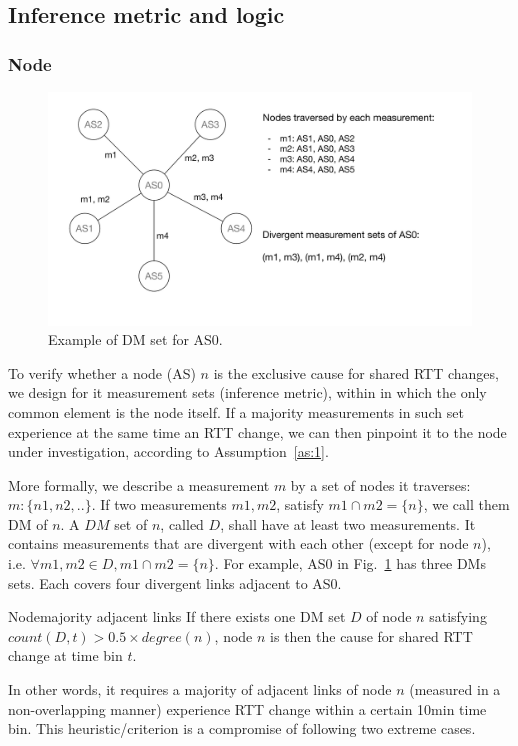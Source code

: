 \subsection{Inference metric and logic}
\subsubsection{Node}
\begin{figure}[!htb]
\centering
\includegraphics[width=1\textwidth]{gfx/chap5/dms.pdf}
\caption{Example of \acf{DM} set for AS0.}
\label{fig:chap5_dms}
\end{figure}

To verify whether a node (AS) $n$ is the exclusive cause for shared RTT changes, we
design for it measurement sets (inference metric), within in which the only common element is the node itself. If a majority measurements in such set experience at the same time an RTT change, we can then pinpoint it to the node under investigation, according to Assumption~\ref{as:1}.

More formally, we describe a measurement $m$ by a set of nodes it traverses: $m:\{n1, n2,..\}$. 
If two measurements $m1, m2$, satisfy $m1 \cap m2 = \{n\}$, we call them \acf{DM} of $n$.
A $DM$ set of $n$, called $D$, shall have at least two measurements. It contains measurements that are divergent with each other (except for node $n$), i.e. $\forall m1, m2 \in D, m1 \cap m2 = \{n\}$.
For example, AS0 in Fig.~\ref{fig:chap5_dms} has three \acp{DM} sets. Each covers four divergent links adjacent to AS0.

\begin{heuristic}{Node}{majority adjacent links}\label{hu:node}
If there exists one \ac{DM} set $D$ of node $n$ satisfying $count(D, t) > 0.5 \times degree(n)$,  node $n$ is then the cause for shared RTT change at time bin $t$. 
\end{heuristic}
In other words, it requires a majority of adjacent links of node $n$ (measured in a non-overlapping manner) experience RTT change within a certain 10min time bin. This heuristic/criterion is a compromise of following two extreme cases.

